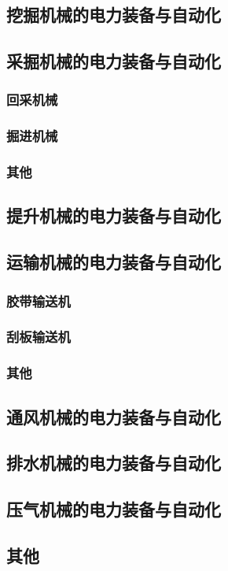 \documentclass[UTF8]{../../ApplicationUniverse}
\begin{document}
    \subsection{挖掘机械的电力装备与自动化}
    \subsection{采掘机械的电力装备与自动化}
        \subsubsection{回采机械}
        \subsubsection{掘进机械}
        \subsubsection{其他}
    \subsection{提升机械的电力装备与自动化}
    \subsection{运输机械的电力装备与自动化}
        \subsubsection{胶带输送机}
        \subsubsection{刮板输送机}
        \subsubsection{其他}
    \subsection{通风机械的电力装备与自动化}
    \subsection{排水机械的电力装备与自动化}
    \subsection{压气机械的电力装备与自动化}
    \subsection{其他}
\end{document}
